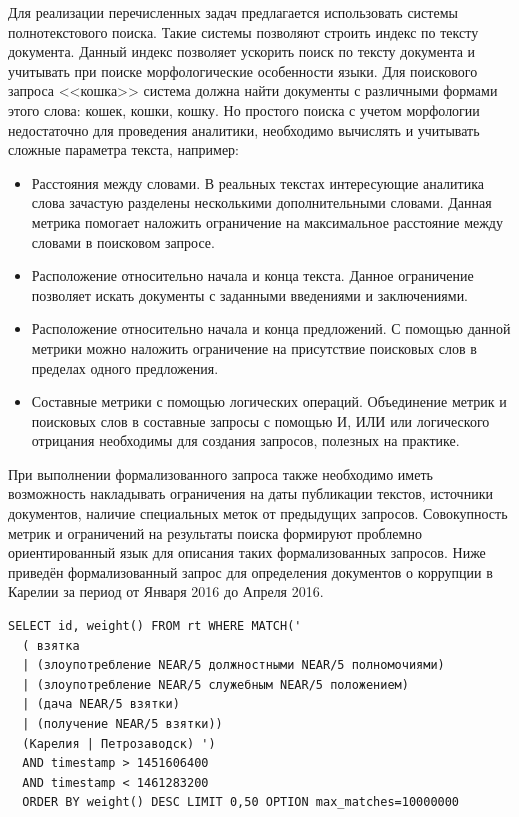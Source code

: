 Для реализации перечисленных задач предлагается использовать системы полнотекстового поиска. Такие системы позволяют строить индекс по тексту документа. Данный индекс позволяет ускорить поиск по тексту документа и учитывать при поиске морфологические особенности языки. Для поискового запроса <<кошка>> система должна найти документы с различными формами этого слова: кошек, кошки, кошку. Но простого поиска с учетом морфологии недостаточно для проведения аналитики, необходимо вычислять и учитывать сложные параметра текста, например:
\begin{itemize}
\item Расстояния между словами. В реальных текстах интересующие аналитика слова зачастую разделены несколькими дополнительными словами. Данная метрика помогает наложить ограничение на максимальное расстояние между словами в поисковом запросе.
\item Расположение относительно начала и конца текста. Данное ограничение позволяет искать документы с заданными введениями и заключениями.
\item Расположение относительно начала и конца предложений. С помощью данной метрики можно наложить ограничение на присутствие поисковых слов в пределах одного предложения.
\item Составные метрики с помощью логических операций. Объединение метрик и поисковых слов в составные запросы с помощью И, ИЛИ или логического отрицания необходимы для создания запросов, полезных на практике. 
\end{itemize}

При выполнении формализованного запроса также необходимо иметь возможность накладывать ограничения на даты публикации текстов, источники документов, наличие специальных меток от предыдущих запросов. Совокупность метрик и ограничений на результаты поиска формируют проблемно ориентированный язык для описания таких формализованных запросов. Ниже приведён формализованный запрос для определения документов о коррупции в Карелии за период от Января 2016 до Апреля 2016.

\begin{verbatim}
SELECT id, weight() FROM rt WHERE MATCH('
  ( взятка 
  | (злоупотребление NEAR/5 должностными NEAR/5 полномочиями) 
  | (злоупотребление NEAR/5 служебным NEAR/5 положением) 
  | (дача NEAR/5 взятки) 
  | (получение NEAR/5 взятки)) 
  (Карелия | Петрозаводск) ') 
  AND timestamp > 1451606400 
  AND timestamp < 1461283200 
  ORDER BY weight() DESC LIMIT 0,50 OPTION max_matches=10000000 
\end{verbatim}

